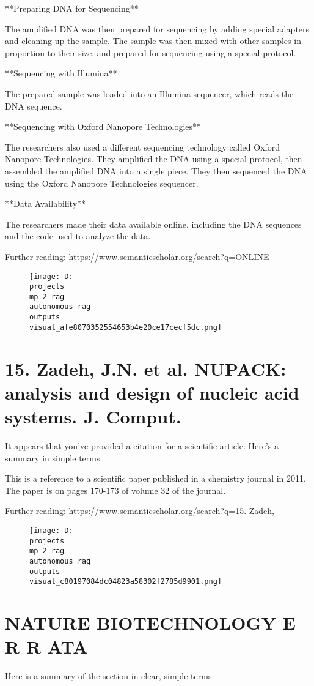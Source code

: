 \documentclass[12pt,a4paper]{article}
\begin{document}
**Preparing DNA for Sequencing**

The amplified DNA was then prepared for sequencing by adding special adapters and cleaning up the sample. The sample was then mixed with other samples in proportion to their size, and prepared for sequencing using a special protocol.

**Sequencing with Illumina**

The prepared sample was loaded into an Illumina sequencer, which reads the DNA sequence.

**Sequencing with Oxford Nanopore Technologies**

The researchers also used a different sequencing technology called Oxford Nanopore Technologies. They amplified the DNA using a special protocol, then assembled the amplified DNA into a single piece. They then sequenced the DNA using the Oxford Nanopore Technologies sequencer.

**Data Availability**

The researchers made their data available online, including the DNA sequences and the code used to analyze the data.

Further reading: https://www.semanticscholar.org/search?q=ONLINE%
\begin{figure}[h]
\centering
\texttt{[image: D:\\projects\\mp 2 rag\\autonomous rag\\outputs\\visual\_afe8070352554653b4e20ce17cecf5dc.png]}
\end{figure}
\section{15.	Zadeh, J.N. et al. NUPACK: analysis and design of nucleic acid systems. J. Comput.}
It appears that you've provided a citation for a scientific article. Here's a summary in simple terms:

This is a reference to a scientific paper published in a chemistry journal in 2011. The paper is on pages 170-173 of volume 32 of the journal.

Further reading: https://www.semanticscholar.org/search?q=15.	Zadeh,%
\begin{figure}[h]
\centering
\texttt{[image: D:\\projects\\mp 2 rag\\autonomous rag\\outputs\\visual\_c80197084dc04823a58302f2785d9901.png]}
\end{figure}
\section{NATURE BIOTECHNOLOGY
E R R ATA}
Here is a summary of the section in clear, simple terms:
\end{document}
